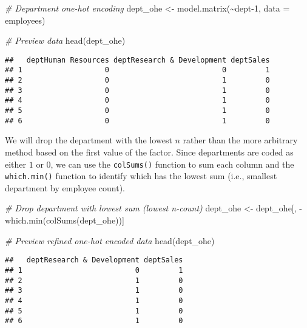 \documentclass[
]{book}
\newenvironment{Shaded}{\begin{snugshade}}{\end{snugshade}}
\newcommand{\AttributeTok}[1]{\textcolor[rgb]{0.77,0.63,0.00}{#1}}
\newcommand{\CommentTok}[1]{\textcolor[rgb]{0.56,0.35,0.01}{\textit{#1}}}
\newcommand{\DecValTok}[1]{\textcolor[rgb]{0.00,0.00,0.81}{#1}}
\newcommand{\FunctionTok}[1]{\textcolor[rgb]{0.00,0.00,0.00}{#1}}
\newcommand{\NormalTok}[1]{#1}
\newcommand{\OtherTok}[1]{\textcolor[rgb]{0.56,0.35,0.01}{#1}}
\newcommand{\SpecialCharTok}[1]{\textcolor[rgb]{0.00,0.00,0.00}{#1}}
\begin{document}
\begin{Shaded}
\begin{Highlighting}[]
\CommentTok{\# Department one{-}hot encoding}
\NormalTok{dept\_ohe }\OtherTok{\textless{}{-}} \FunctionTok{model.matrix}\NormalTok{(}\SpecialCharTok{\textasciitilde{}}\NormalTok{dept}\DecValTok{{-}1}\NormalTok{, }\AttributeTok{data =}\NormalTok{ employees)}

\CommentTok{\# Preview data}
\FunctionTok{head}\NormalTok{(dept\_ohe)}
\end{Highlighting}
\end{Shaded}

\begin{verbatim}
##   deptHuman Resources deptResearch & Development deptSales
## 1                   0                          0         1
## 2                   0                          1         0
## 3                   0                          1         0
## 4                   0                          1         0
## 5                   0                          1         0
## 6                   0                          1         0
\end{verbatim}

We will drop the department with the lowest \(n\) rather than the more arbitrary method based on the first value of the factor. Since departments are coded as either \(1\) or \(0\), we can use the \texttt{colSums()} function to sum each column and the \texttt{which.min()} function to identify which has the lowest sum (i.e., smallest department by employee count).

\begin{Shaded}
\begin{Highlighting}[]
\CommentTok{\# Drop department with lowest sum (lowest n{-}count)}
\NormalTok{dept\_ohe }\OtherTok{\textless{}{-}}\NormalTok{ dept\_ohe[, }\SpecialCharTok{{-}}\FunctionTok{which.min}\NormalTok{(}\FunctionTok{colSums}\NormalTok{(dept\_ohe))]}

\CommentTok{\# Preview refined one{-}hot encoded data}
\FunctionTok{head}\NormalTok{(dept\_ohe)}
\end{Highlighting}
\end{Shaded}

\begin{verbatim}
##   deptResearch & Development deptSales
## 1                          0         1
## 2                          1         0
## 3                          1         0
## 4                          1         0
## 5                          1         0
## 6                          1         0
\end{verbatim}
\end{document}
